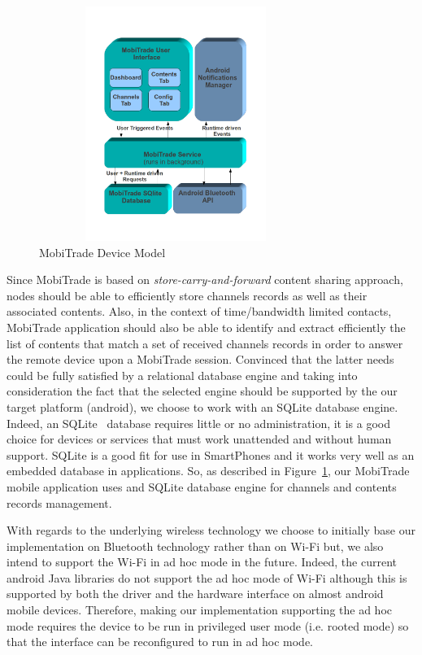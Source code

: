 \begin{figure}[!h]
\centering
\includegraphics[width=3.5in,height=3in]{Chapitre6/MobiTradeCommunicationArchitecture.png}
\caption{MobiTrade Device Model}
\label{MobiTrade-application}
\end{figure}

Since MobiTrade is based on \emph{store-carry-and-forward} content sharing approach, nodes should be able to efficiently store channels records as well as their associated contents. Also, in the context of time/bandwidth limited contacts, MobiTrade application should also be able to identify and extract efficiently the list of contents that match a set of received channels records in order to answer the remote device upon a MobiTrade session. Convinced that the latter needs could be fully satisfied by a relational database engine and taking into consideration the fact that the selected engine should be supported by the our target platform (android), we choose to work with an SQLite database engine. Indeed, an SQLite~\cite{SQLite} database requires little or no administration, it is a good choice for devices or services that must work unattended and without human support. SQLite is a good fit for use in SmartPhones and it works very well as an embedded database in applications. So, as described in Figure~\ref{MobiTrade-application}, our MobiTrade mobile application uses and SQLite database engine for channels and contents records management.

With regards to the underlying wireless technology we choose to initially base our implementation on Bluetooth technology rather than on Wi-Fi but, we also intend to support the Wi-Fi in ad hoc mode in the future. Indeed, the current android Java libraries do not support the ad hoc mode of Wi-Fi although this is supported by both the driver and the hardware interface on almost android mobile devices. Therefore, making our implementation supporting the ad hoc mode requires the device to be run in privileged user mode (i.e. rooted mode) so that the interface can be reconfigured to run in ad hoc mode.

